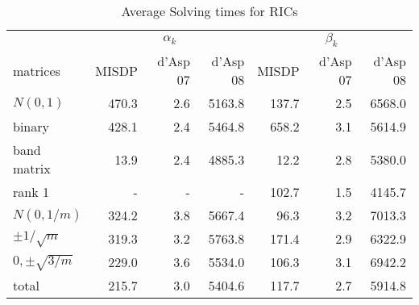 \begin{table} 
 \begin{scriptsize} \caption{Average Solving times for RICs} 
 \label{lhsRhsTime} 
 \begin{tabular*}{\linewidth}{@{}l@{\;\;\extracolsep{\fill}}rrrrrr@{}}\toprule 
  & \multicolumn{3}{c}{$\alpha_k$} & \multicolumn{3}{c}{$\beta_k$} \\ 
\cmidrule(r){2-4} \cmidrule(l){5-7} 
 matrices & MISDP & d'Asp 07 & d'Asp 08 & MISDP & d'Asp 07 & d'Asp 08 \\ \midrule 
$N(0,1)$& \num{470.3} & \num{2.6} & \num{5163.8} & \num{137.7} & \num{2.5} & \num{6568.0} \\ 
 binary& \num{428.1} & \num{2.4} & \num{5464.8} & \num{658.2} & \num{3.1} & \num{5614.9} \\ 
 band matrix& \num{13.9} & \num{2.4} & \num{4885.3} & \num{12.2} & \num{2.8} & \num{5380.0} \\ 
 rank 1& - & - & - & \num{102.7} & \num{1.5} & \num{4145.7} \\ 
 $N(0,1/m)$& \num{324.2} & \num{3.8} & \num{5667.4} & \num{96.3} & \num{3.2} & \num{7013.3} \\ 
 $\pm 1/\sqrt{m}$& \num{319.3} & \num{3.2} & \num{5763.8} & \num{171.4} & \num{2.9} & \num{6322.9} \\ 
 $0, \pm \sqrt{3/m}$& \num{229.0} & \num{3.6} & \num{5534.0} & \num{106.3} & \num{3.1} & \num{6942.2} \\ 
 \midrule 
total & \num{215.7} & \num{3.0} & \num{5404.6} & \num{117.7} & \num{2.7} & \num{5914.8} \\ 
 \bottomrule 
 \end{tabular*} 
 \end{scriptsize} 
 \end{table} 
